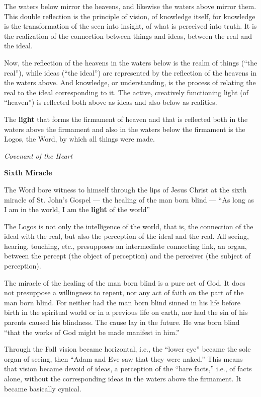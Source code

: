 The waters below mirror the heavens, and likewise the waters above mirror them. This double reflection is the principle
of vision, of knowledge itself, for knowledge is the transformation of the seen into insight, of what is perceived into
truth. It is the realization of the connection between things and ideas, between the real and the ideal.

Now, the reflection of the heavens in the waters below is the realm of things (“the real”), while ideas (“the ideal”)
are represented by the reflection of the heavens in the waters above. And knowledge, or understanding, is the process
of relating the real to the ideal corresponding to it. The active, creatively functioning light (of “heaven”) is
reflected both above as ideas and also below as realities.

\begin{quotationx}
The \textbf{light} that forms the firmament of heaven and that is reflected both in the waters above the firmament and
also in the waters below the firmament is the Logos, the Word, by which all things were made. \begin{flushright} \emph{Covenant of
the Heart}\end{flushright}

\end{quotationx}
\textbf{Sixth Miracle}

The Word bore witness to himself through the lips of Jesus Christ at the sixth miracle of St.
John's Gospel — the healing of the man born blind — “As
long as I am in the world, I am the \textbf{light} of the world”

The Logos is not only the intelligence of the world, that is, the connection of the ideal with the real, but also the
perception of the ideal and the real. All seeing, hearing, touching, etc., presupposes an intermediate connecting link,
an organ, between the percept (the object of perception) and the perceiver (the subject of perception).

The miracle of the healing of the man born blind is a pure act of God. It does not presuppose a willingness to repent,
nor any act of faith on the part of the man born blind. For neither had the man born blind sinned in his life before
birth in the spiritual world or in a previous life on earth, nor had the sin of his parents caused his blindness. The
cause lay in the future. He was born blind “that the works of God might be made manifest in him.”

Through the Fall vision became horizontal, i.e., the “lower eye” became the sole organ of seeing, then “Adam and Eve saw
that they were naked.” This means that vision became devoid of ideas, a perception of the “bare facts,” i.e., of facts
alone, without the corresponding ideas in the waters above the firmament. It became basically cynical.

